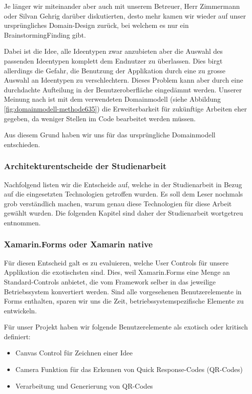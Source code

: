 Je länger wir miteinander aber auch mit unserem Betreuer, Herr Zimmermann oder Silvan Gehrig darüber diskutierten, desto mehr kamen wir wieder auf unser ursprüngliches Domain-Design zurück, bei welchem es nur ein BrainstormingFinding gibt. 

Dabei ist die Idee, alle Ideentypen zwar anzubieten aber die Auswahl des passenden Ideentypen komplett dem Endnutzer zu überlassen. Dies birgt allerdings die Gefahr, die Benutzung der Applikation durch eine zu grosse Auswahl an Ideentypen zu verschlechtern. Dieses Problem kann aber durch eine durchdachte Aufteilung in der Benutzeroberfläche eingedämmt werden. Unserer Meinung nach ist mit dem verwendeten Domainmodell (siehe Abbildung \ref{fig:domainmodell-methode635}) die Erweiterbarkeit für zukünftige Arbeiten eher gegeben, da weniger Stellen im Code bearbeitet werden müssen. 

Aus diesem Grund haben wir uns für das ursprüngliche Domainmodell entschieden.

\subsubsection{Architekturentscheide der Studienarbeit}
Nachfolgend listen wir die Entscheide auf, welche in der Studienarbeit in Bezug auf die eingesetzten Technologien getroffen wurden. Es soll dem Leser nochmals grob verständlich machen, warum genau diese Technologien für diese Arbeit gewählt wurden.
Die folgenden Kapitel sind daher der Studienarbeit \cite{methode635-sa} wortgetreu entnommen.

\subsubsection{Xamarin.Forms oder Xamarin native}\label{subsubsec:forms-vs-native}
Für diesen Entscheid galt es zu evaluieren, welche User Controls für unsere Applikation die exotischsten sind. Dies, weil Xamarin.Forms eine Menge an Standard-Controls anbietet, die vom Framework selber in das jeweilige Betriebssystem konvertiert werden. Sind alle vorgesehenen Benutzerelemente in Forms enthalten, sparen wir uns die Zeit, betriebssystemspezifische Elemente zu entwickeln. 

Für unser Projekt haben wir folgende Benutzerelemente als exotisch oder kritisch definiert:
\begin{itemize}
	\item Canvas Control für Zeichnen einer Idee
	\item Camera Funktion für das Erkennen von Quick Response-Codes (QR-Codes)
	\item Verarbeitung und Generierung von QR-Codes
\end{itemize}

